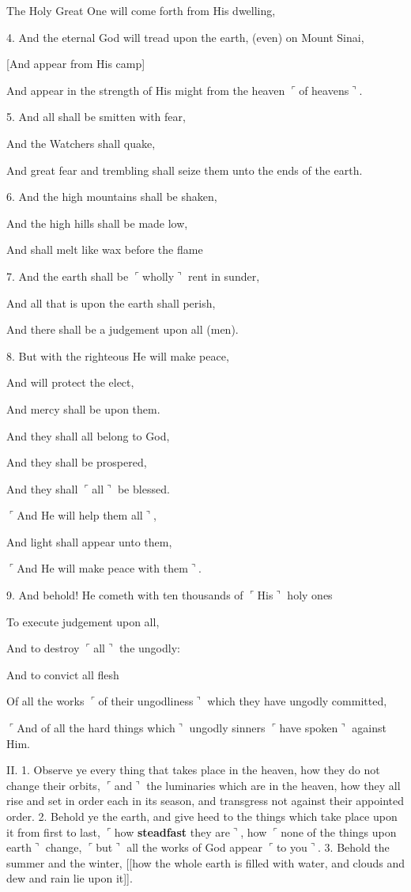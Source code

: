 The Holy Great One will come forth from His dwelling,

4. And the eternal God will tread upon the earth, (even) on Mount Sinai,

[And appear from His camp]

And appear in the strength of His might from the heaven $\ulcorner$of heavens$\urcorner$.

5. And all shall be smitten with fear,

And the Watchers shall quake,

And great fear and trembling shall seize them unto the ends of the earth.

6. And the high mountains shall be shaken,

And the high hills shall be made low,

And shall melt like wax before the flame

7. And the earth shall be $\ulcorner$wholly$\urcorner$ rent in sunder,

And all that is upon the earth shall perish,

And there shall be a judgement upon all (men).

8. But with the righteous He will make peace,

And will protect the elect,

And mercy shall be upon them.

And they shall all belong to God,

And they shall be prospered,

And they shall $\ulcorner$all$\urcorner$ be blessed.

$\ulcorner$And He will help them all$\urcorner$,

And light shall appear unto them,

$\ulcorner$And He will make peace with them$\urcorner$.

9. And behold! He cometh with ten thousands of $\ulcorner$His$\urcorner$ holy ones

To execute judgement upon all,

And to destroy $\ulcorner$all$\urcorner$ the ungodly:

And to convict all flesh

Of all the works $\ulcorner$of their ungodliness$\urcorner$ which they have ungodly committed,

$\ulcorner$And of all the hard things which$\urcorner$ ungodly sinners $\ulcorner$have spoken$\urcorner$ against Him.

II. 1. Observe ye every thing that takes place in
the heaven, how they do not change their orbits,
$\ulcorner$and$\urcorner$ the luminaries which are in the heaven, how
they all rise and set in order each in its season, and
transgress not against their appointed order. 2. Behold
ye the earth, and give heed to the things which
take place upon it from first to last, $\ulcorner$how \textbf{steadfast}
they are$\urcorner$, how $\ulcorner$none of the things upon earth$\urcorner$
change, $\ulcorner$but$\urcorner$ all the works of God appear $\ulcorner$to you$\urcorner$.
3. Behold the summer and the winter, [[how the
whole earth is filled with water, and clouds and dew
and rain lie upon it]].

